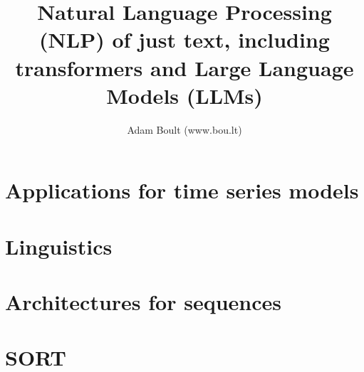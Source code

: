\documentclass[oneside]{book}
\begin{document}
\author{Adam Boult (www.bou.lt)}
\title{Natural Language Processing (NLP) of just text, including transformers and Large Language Models (LLMs)}
\maketitle

\setcounter{tocdepth}{0}
\tableofcontents



\part{Applications for time series models}





\part{Linguistics}




\part{Architectures for sequences}




\part{SORT}

\end{document}
